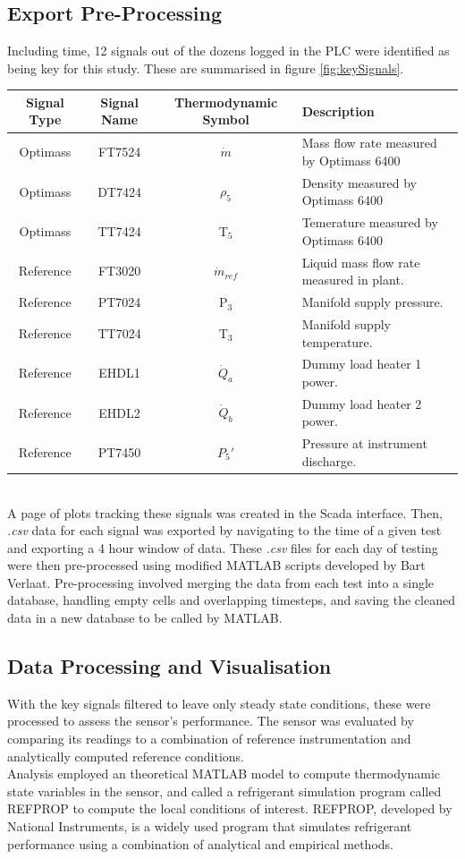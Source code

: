 \documentclass{report}
\begin{document}
\subsection{Export Pre-Processing} %
Including time, 12 signals out of the dozens logged in the PLC were identified as being key for this study. These are summarised in figure \ref{fig:keySignals}.\\
\begin{tabular}{|c|c|c|l|}\label{tab:keySignals} 
Signal Type & Signal Name & Thermodynamic Symbol & Description \\\hline
Optimass & FT7524 & $\dot{m}$ & Mass flow rate measured by Optimass 6400\\\hline
Optimass & DT7424 & $\rho_5$ & Density measured by Optimass 6400 \\\hline
Optimass & TT7424 & T$_5$ & Temerature measured by Optimass 6400 \\\hline
Reference & FT3020 &  $\dot{m}_{ref}$ & Liquid mass flow rate measured in plant. \\\hline
Reference & PT7024 & P$_3$ & Manifold supply pressure. \\\hline
Reference & TT7024 & T$_3$ & Manifold supply temperature. \\\hline
Reference & EHDL1 & $\dot{Q}_a$ & Dummy load heater 1 power. \\\hline
Reference & EHDL2 & $\dot{Q}_b$ & Dummy load heater 2 power. \\\hline
Reference & PT7450 & $P_5'$ & Pressure at instrument discharge. \\\hline
\end{tabular}
\\
A page of plots tracking these signals was created in the Scada interface. Then, \textit{.csv} data for each signal was exported by navigating to the time of a given test and exporting a 4 hour window of data. These \textit{.csv} files for each day of testing were then pre-processed using modified MATLAB scripts developed by Bart Verlaat. Pre-processing involved merging the data from each test into a single database, handling empty cells and overlapping timesteps, and saving the cleaned data in a new database to be called by MATLAB. 
\subsection{Data Processing and Visualisation}
With the key signals filtered to leave only steady state conditions, these were processed to assess the sensor's performance. The sensor was evaluated by comparing its readings to a combination of reference instrumentation and analytically computed reference conditions. \\
Analysis employed an theoretical MATLAB model to compute thermodynamic state variables in the sensor, and called a refrigerant simulation program called REFPROP to compute the local conditions of interest. %
REFPROP, developed by National Instruments, is a widely used program that simulates refrigerant performance using a combination of analytical and empirical methods. %
\end{document}
